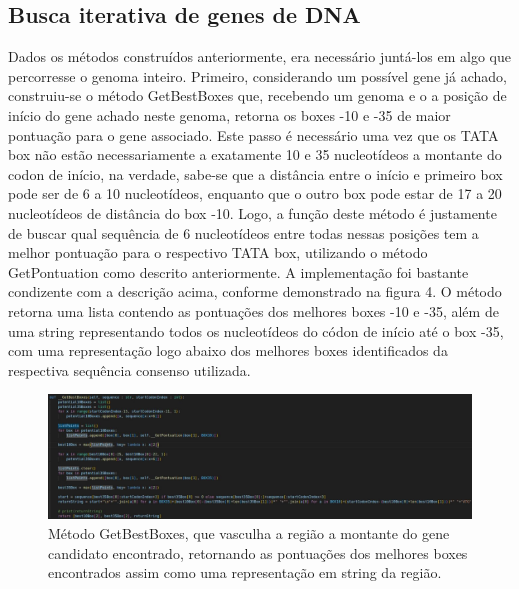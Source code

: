 \documentclass[brazilian,12pt,a4paper,final]{article}
\begin{document}
\subsection{Busca iterativa de genes de DNA}
Dados os métodos construídos anteriormente, era necessário juntá-los em algo que percorresse o genoma inteiro. Primeiro, considerando um possível gene já achado, construiu-se o método GetBestBoxes que, recebendo um genoma e o a posição de início do gene achado neste genoma, retorna os boxes -10 e -35 de maior pontuação para o gene associado. Este passo é necessário uma vez que os TATA box não estão necessariamente a exatamente 10 e 35 nucleotídeos a montante do codon de início, na verdade, sabe-se que a distância entre o início e primeiro box pode ser de 6 a 10 nucleotídeos, enquanto que o outro box pode estar de 17 a 20 nucleotídeos de distância do box -10. Logo, a função deste método é justamente de buscar qual sequência de 6 nucleotídeos entre todas nessas posições tem a melhor pontuação para o respectivo TATA box, utilizando o método GetPontuation como descrito anteriormente. A implementação foi bastante condizente com a descrição acima, conforme demonstrado na figura 4. O método retorna uma lista contendo as pontuações dos melhores boxes -10 e -35, além de uma string representando todos os nucleotídeos do códon de início até o box -35, com uma representação logo abaixo dos melhores boxes identificados da respectiva sequência consenso utilizada.

\begin{figure}[hbtp]
	\begin{center}
		\includegraphics[]{GetBestBoxes.jpg}
		\caption{Método GetBestBoxes, que vasculha a região a montante do gene candidato encontrado, retornando as pontuações dos melhores boxes encontrados assim como uma representação em string da região.}
		\label{fig}
	\end{center}
\end{figure}
	
\end{document}
